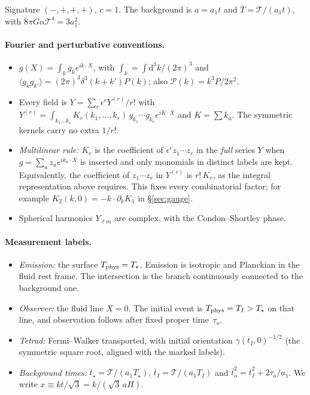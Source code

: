 \documentclass[11pt]{article}
\theoremstyle{definition}
\theoremstyle{remark}
\newcommand{\eps}{\epsilon}
\newcommand{\dd}{\mathrm{d}}
\newcommand{\ens}[1]{\langle #1\rangle}
\newcommand{\T}{\mathcal{T}}
\begin{document}
Signature $(-,+,+,+)$, $c=1$. The background is $a=a_1t$ and $\bar T=\T/(a_1t)$, with
$8\pi G\alpha\T^4=3a_1^2$.

\paragraph{Fourier and perturbative conventions.}
\begin{itemize}
\item $g(X)=\int_k g_k e^{ik\cdot X}$, with $\int_k=\int\dd^3k/(2\pi)^3$ and
  $\ens{g_kg_{k'}}=(2\pi)^3\delta^3(k+k')P(k)$; also $\mathcal P(k)=k^3P/2\pi^2$.
\item Every field is $Y=\sum_r\eps^rY^{(r)}/r!$ with
  $Y^{(r)}=\int_{k_1\ldots k_r}K_r(k_1,\ldots,k_r)\,g_{k_1}\cdots g_{k_r}e^{iK\cdot X}$ and
  $K=\sum k_a$. The symmetric kernels carry no extra $1/r!$.
\item \emph{Multilinear rule:} $K_r$ is the coefficient of $\eps^rz_1\cdots z_r$ in the
  \emph{full} series $Y$ when $g=\sum_az_ae^{ik_a\cdot X}$ is inserted and only monomials in
  distinct labels are kept. Equivalently, the coefficient of $z_1\cdots z_r$ in $Y^{(r)}$ is
  $r!\,K_r$, as the integral representation above requires. This fixes every combinatorial
  factor; for example $K_2(k,0)=-k\cdot\partial_kK_1$ in \S\ref{sec:gauge}.
\item Spherical harmonics $Y_{\ell m}$ are complex, with the Condon--Shortley phase.
\end{itemize}

\paragraph{Measurement labels.}
\begin{itemize}
\item \emph{Emission:} the surface $T_{\rm phys}=T_\star$. Emission is isotropic and Planckian
  in the fluid rest frame. The intersection is the branch continuously connected to the
  background one.
\item \emph{Observer:} the fluid line $X=0$. The initial event is $T_{\rm phys}=T_I>T_\star$ on
  that line, and observation follows after fixed proper time~$\tau_o$.
\item \emph{Tetrad:} Fermi--Walker transported, with initial orientation
  $\gamma(t_I,0)^{-1/2}$ (the symmetric square root, aligned with the marked labels).
\item \emph{Background times:} $\bar t_\star=\T/(a_1T_\star)$, $\bar t_I=\T/(a_1T_I)$ and
  $\bar t_o^2=\bar t_I^2+2\tau_o/a_1$. We write $x\equiv kt/\sqrt3=k/(\sqrt3\,aH)$.
\end{itemize}
\end{document}
